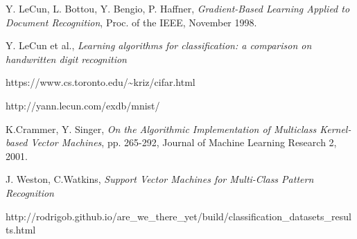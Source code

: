 
\begin{thebibliography}{9}

  Y. LeCun, L. Bottou, Y. Bengio, P. Haffner,
  \emph{Gradient-Based Learning Applied to Document Recognition},
  Proc. of the IEEE,
  November 1998.

  Y. LeCun et al.,
  \emph{Learning algorithms for classification:
  a comparison on handwritten digit recognition}

  https://www.cs.toronto.edu/{\textasciitilde}kriz/cifar.html

  http://yann.lecun.com/exdb/mnist/

  K.Crammer, Y. Singer,
  \emph{On the Algorithmic Implementation of Multiclass Kernel-based Vector Machines},
  pp. 265-292,
  Journal of Machine Learning Research 2,
  2001.

  J. Weston, C.Watkins,
  \emph{Support Vector Machines for Multi-Class Pattern Recognition}

  http://rodrigob.github.io/are\_we\_there\_yet/build/classification\_datasets\_results.html

\end{thebibliography}
